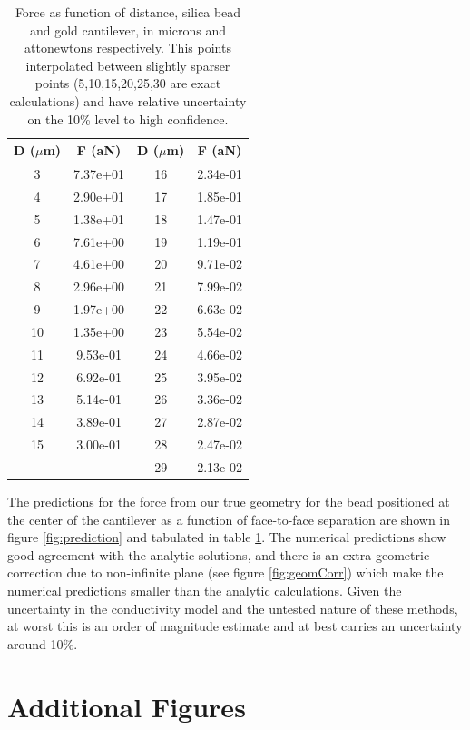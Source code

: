 \documentclass[11pt,traditabstract]{article}
\begin{document}
\begin{table}[h]
\centering
\begin{tabular}{c | c || c | c}
D ($\mu$m) & F (aN) &D ($\mu$m) & F (aN) \\
\hline
   3 & 7.37e+01 &  16 & 2.34e-01 \\
   4 & 2.90e+01 & 17 & 1.85e-01 \\
   5 & 1.38e+01 &  18 & 1.47e-01 \\
   6 & 7.61e+00 &  19 & 1.19e-01 \\
   7 & 4.61e+00 & 20 & 9.71e-02 \\
   8 & 2.96e+00 &  21 & 7.99e-02 \\
   9 & 1.97e+00 &  22 & 6.63e-02 \\
  10 & 1.35e+00 &  23 & 5.54e-02 \\
  11 & 9.53e-01 & 24 & 4.66e-02 \\
  12 & 6.92e-01 &  25 & 3.95e-02 \\
  13 & 5.14e-01 &  26 & 3.36e-02 \\
  14 & 3.89e-01 & 27 & 2.87e-02 \\
  15 & 3.00e-01 & 28 & 2.47e-02 \\
   & & 29 & 2.13e-02 \\
   \hline
\end{tabular}
\caption{Force as function of distance, silica bead and gold cantilever, in microns and attonewtons respectively. This points interpolated between slightly sparser points (5,10,15,20,25,30 are exact calculations) and have relative uncertainty on the 10\% level to high confidence.}\label{tab:pred}
\end{table}

The predictions for the force from our true geometry for the bead positioned at the center of the cantilever as a function of face-to-face separation are shown in figure \ref{fig:prediction} and tabulated in table \ref{tab:pred}. The numerical predictions show good agreement with the analytic solutions, and there is an extra geometric correction due to non-infinite plane (see figure \ref{fig:geomCorr}) which make the numerical predictions smaller than the analytic calculations. Given the uncertainty in the conductivity model and the untested nature of these methods, at worst this is an order of magnitude estimate and at best carries an uncertainty around 10\%.

\clearpage
\appendix
\section{Additional Figures}
\end{document}
